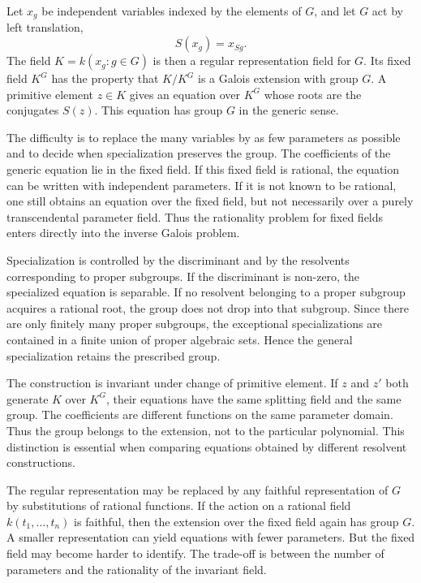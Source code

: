 \documentclass[11pt]{article}
\begin{document}
Let \(x_g\) be independent variables indexed by the elements of \(G\), and let \(G\) act by left
translation, \[   S(x_g)=x_{Sg}. \] The field \(K=k(x_g:g\in G)\) is then a regular representation
field for \(G\). Its fixed field \(K^G\) has the property that \(K/K^G\) is a Galois extension with
group \(G\). A primitive element \(z\in K\) gives an equation over \(K^G\) whose roots are the
conjugates \(S(z)\). This equation has group \(G\) in the generic sense.


The difficulty is to replace the many variables by as few parameters as possible and to decide when
specialization preserves the group. The coefficients of the generic equation lie in the fixed field.
If this fixed field is rational, the equation can be written with independent parameters. If it is
not known to be rational, one still obtains an equation over the fixed field, but not necessarily
over a purely transcendental parameter field. Thus the rationality problem for fixed fields enters
directly into the inverse Galois problem.


Specialization is controlled by the discriminant and by the resolvents corresponding to proper
subgroups. If the discriminant is non-zero, the specialized equation is separable. If no resolvent
belonging to a proper subgroup acquires a rational root, the group does not drop into that subgroup.
Since there are only finitely many proper subgroups, the exceptional specializations are contained
in a finite union of proper algebraic sets. Hence the general specialization retains the prescribed
group.


The construction is invariant under change of primitive element. If \(z\) and \(z'\) both generate
\(K\) over \(K^G\), their equations have the same splitting field and the same group. The
coefficients are different functions on the same parameter domain. Thus the group belongs to the
extension, not to the particular polynomial. This distinction is essential when comparing equations
obtained by different resolvent constructions.


The regular representation may be replaced by any faithful representation of \(G\) by substitutions
of rational functions. If the action on a rational field \(k(t_1, \ldots,t_n)\) is faithful, then
the extension over the fixed field again has group \(G\). A smaller representation can yield
equations with fewer parameters. But the fixed field may become harder to identify. The trade-off is
between the number of parameters and the rationality of the invariant field.
\end{document}
